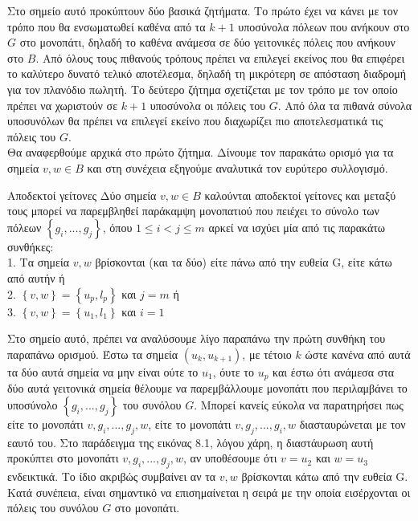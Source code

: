 \documentclass[oneside,12pt]{book}
\theoremstyle{definition}
\begin{document}
Στο σημείο αυτό προκύπτουν δύο βασικά ζητήματα. Το πρώτο έχει να κάνει με τον τρόπο που θα ενσωματωθεί καθένα από τα \(k+1\) υποσύνολα πόλεων που ανήκουν στο \(G\) στο μονοπάτι, δηλαδή το καθένα ανάμεσα σε δύο γειτονικές πόλεις που ανήκουν στο \(B\). Από όλους τους πιθανούς τρόπους πρέπει να επιλεγεί εκείνος που θα επιφέρει το καλύτερο δυνατό τελικό αποτέλεσμα, δηλαδή τη μικρότερη σε απόσταση διαδρομή για τον πλανόδιο πωλητή. Το δεύτερο ζήτημα σχετίζεται με τον τρόπο με τον οποίο πρέπει να χωριστούν σε \(k+1\) υποσύνολα οι πόλεις του \(G\). Από όλα τα πιθανά σύνολα υποσυνόλων θα πρέπει να επιλεγεί εκείνο που διαχωρίζει πιο αποτελεσματικά τις πόλεις του \(G\). \\

Θα αναφερθούμε αρχικά στο πρώτο ζήτημα. Δίνουμε τον παρακάτω ορισμό για τα σημεία \(v,w \in B\) και στη συνέχεια εξηγούμε αναλυτικά τον ευρύτερο συλλογισμό.

\begin{mydefinition}{Αποδεκτοί γείτονες}{}
	Δύο σημεία \(v,w \in B\) καλούνται αποδεκτοί γείτονες και μεταξύ τους μπορεί να παρεμβληθεί παράκαμψη μονοπατιού που πειέχει το σύνολο των πόλεων \(\left\{g_i,...,g_j\right\}\), όπου \(1 \leq i < j \leq m\) αρκεί να ισχύει μία από τις παρακάτω συνθήκες: \\
	1. Τα σημεία \(v,w\) βρίσκονται (και τα δύο) είτε πάνω από την ευθεία G, είτε κάτω από αυτήν ή \\
	2. \(\left\{v,w\right\} = \left\{u_p, l_p\right\}\) και \(j = m\) ή \\
	3. \(\left\{v,w\right\} = \left\{u_1, l_1\right\}\) και \(i = 1\)
\end{mydefinition}

Στο σημείο αυτό, πρέπει να αναλύσουμε λίγο παραπάνω την πρώτη συνθήκη του παραπάνω ορισμού. Έστω τα σημεία \((u_k, u_{k+1})\), με τέτοιο \(k\) ώστε κανένα από αυτά τα δύο αυτά σημεία να μην είναι ούτε το \(u_1\), όυτε το \(u_p\) και έστω ότι ανάμεσα στα δύο αυτά γειτονικά σημεία θέλουμε να παρεμβάλλουμε μονοπάτι που περιλαμβάνει το υποσύνολο \(\left\{g_i,...,g_j\right\}\) του συνόλου \(G\). Μπορεί κανείς εύκολα να παρατηρήσει πως είτε το μονοπάτι \(v,g_i,...,g_j, w\), είτε το μονοπάτι \(v,g_j,...,g_i,w\) διασταυρώνεται με τον εαυτό του. Στο παράδειγμα της εικόνας 8.1, λόγου χάρη, η διαστάυρωση αυτή προκύπτει στο μονοπάτι \(v,g_i,...,g_j, w\), αν υποθέσουμε ότι \(v = u_2\) και \(w = u_3\) ενδεικτικά. Το ίδιο ακριβώς συμβαίνει αν τα \(v,w\) βρίσκονται κάτω από την ευθεία G. Κατά συνέπεια, είναι σημαντικό να επισημαίνεται η σειρά με την οποία εισέρχονται οι πόλεις του συνόλου \(G\) στο μονοπάτι. \\
\end{document}
